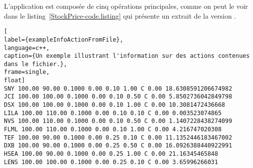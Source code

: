 L'application  est compos\'ee de cinq op\'erations principales, comme on peut le voir dans le listing~\ref{StockPrice-code.listing} qui présente un extrait de la version \ppff.

\begin{lstlisting}[
label={exampleInfoActionFromFile},
language=c++,
caption={Un exemple illustrant l'information sur des actions contenues dans le fichier.},
frame=single,
float]
SNY 100.00 90.00 0.1000 0.00 0.10 1.00 C 0.00 18.6308591206674982
JCI 100.00 100.00 0.1000 0.00 0.10 0.50 C 0.00 5.8502736042849798
DSX 100.00 100.00 0.1000 0.00 0.10 1.00 C 0.00 10.3081472436668
LILA 100.00 110.00 0.1000 0.00 0.10 0.10 C 0.00 0.003523074865
NVS 100.00 110.00 0.1000 0.00 0.10 0.50 C 0.00 1.1407228438274099
FLML 100.00 110.00 0.1000 0.00 0.10 1.00 C 0.00 4.216747020308
TEF 100.00 90.00 0.1000 0.00 0.25 0.10 C 0.00 11.1352446183467002
DXB 100.00 90.00 0.1000 0.00 0.25 0.50 C 0.00 16.0926388440922991
HSEA 100.00 90.00 0.1000 0.00 0.25 1.00 C 0.00 21.16345465848
LENS 100.00 100.00 0.1000 0.00 0.25 0.10 C 0.00 3.65996266031
\end{lstlisting}


